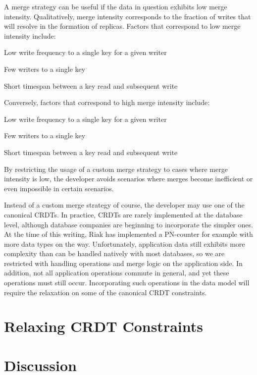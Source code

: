 \documentclass[twoside]{article}
\begin{document}
\begin{multicols}{2}
A merge strategy can be useful if the data in question exhibits low
merge intensity. Qualitatively, merge intensity corresponds to the
fraction of writes that will resolve in the formation of
replicas. Factors that correspond to low merge intensity include:
\begin{compactitem}
  \item Low write frequency to a single key for a given writer
  \item Few writers to a single key
  \item Short timespan between a key read and subsequent write
\end{compactitem}
Conversely, factors that correspond to high merge intensity include:
\begin{compactitem}
  \item Low write frequency to a single key for a given writer
  \item Few writers to a single key
  \item Short timespan between a key read and subsequent write
\end{compactitem}
By restricting the usage of a custom merge strategy to cases where
merge intensity is low, the developer avoids scenarios where merges
become inefficient or even impossible in certain scenarios.

Instead of a custom merge strategy of course, the developer may use
one of the canonical CRDTs. In practice, CRDTs are rarely implemented
at the database level, although database companies are beginning to
incorporate the simpler ones. At the time of this writing, Riak has
implemented a PN-counter for example \cite{riak2013} with more data
types on the way. Unfortunately, application data still exhibits more
complexity than can be handled natively with most databases, so we are
restricted with handling operations and merge logic on the application
side. In addition, not all application operations commute in general,
and yet these operations must still occur. Incorporating such
operations in the data model will require the relaxation on some of
the canonical CRDT constraints.


\section{Relaxing CRDT Constraints}



\section{Discussion}

\end{multicols}
\end{document}
